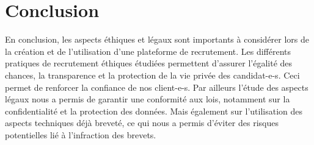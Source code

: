 \section{Conclusion} 
En conclusion, les aspects éthiques et légaux sont importants à considérer lors de la création et de l'utilisation d'une plateforme de recrutement.
Les différents pratiques de recrutement éthiques étudiées permettent d’assurer l'égalité des chances, la transparence et la protection de la vie privée des candidat-e-s.
Ceci permet de renforcer la confiance de nos client-e-s.
Par ailleurs l’étude des aspects légaux nous a permis de garantir une conformité aux lois,
 notamment sur la confidentialité et la protection des données. Mais également sur l’utilisation des aspects techniques déjà breveté, 
 ce qui nous a permis d’éviter des risques potentielles lié à l’infraction des brevets. 
